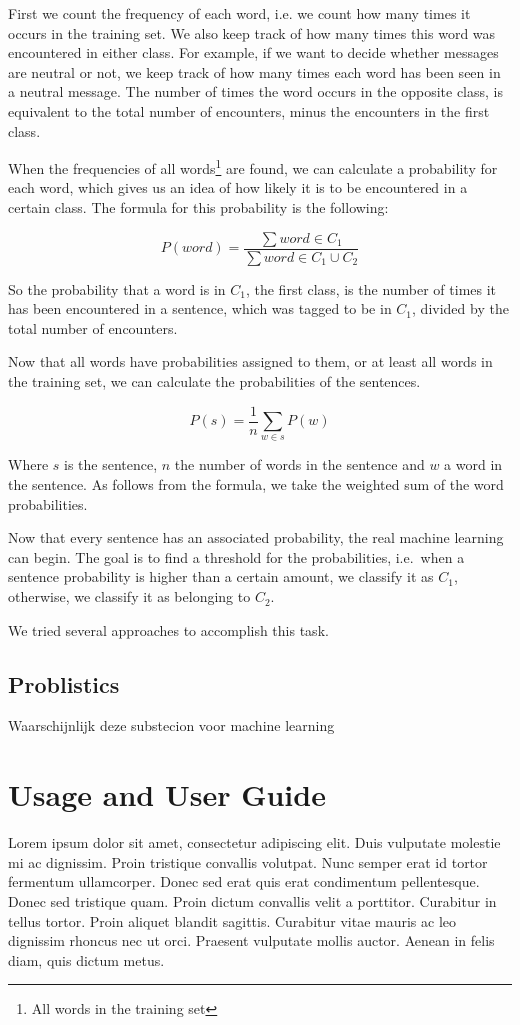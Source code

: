 \documentclass[11pt]{article}
\begin{document}
First we count the frequency of each word, i.e. we count how many times it occurs in the training set. We also keep track of how many times this word was encountered in either class. For example, if we want to decide whether messages are neutral or not, we keep track of how many times each word has been seen in a neutral message. The number of times the word occurs in the opposite class, is equivalent to the total number of encounters, minus the encounters in the first class.

When the frequencies of all words\footnote{All words in the training set} are found, we can calculate a probability for each word, which gives us an idea of how likely it is to be encountered in a certain class. The formula for this probability is the following:

\begin{equation}
P(word) = \frac{ \sum word \in C_1}{\sum word \in C_1\cup C_2}
\end{equation}

So the probability that a word is in $C_1$, the first class, is the number of times it has been encountered in a sentence, which was tagged to be in $C_1$, divided by the total number of encounters.

Now that all words have probabilities assigned to them, or at least all words in the training set, we can calculate the probabilities of the sentences.

\begin{equation}
P(s) = \frac{1}{n} \sum_{w \in s} P(w)
\end{equation}

Where $s$ is the sentence, $n$ the number of words in the sentence and $w$ a word in the sentence. As follows from the formula, we take the weighted sum of the word probabilities.

Now that every sentence has an associated probability, the real machine learning can begin. The goal is to find a threshold for the probabilities, i.e.\ when a sentence probability is higher than a certain amount, we classify it as $C_1$,  otherwise, we classify it as belonging to $C_2$.

We tried several approaches to accomplish this task.

\subsection{Problistics}
Waarschijnlijk deze substecion voor machine learning

\section{Usage and User Guide}
Lorem ipsum dolor sit amet, consectetur adipiscing elit. Duis vulputate molestie mi ac dignissim. Proin tristique convallis volutpat. Nunc semper erat id tortor fermentum ullamcorper. Donec sed erat quis erat condimentum pellentesque. Donec sed tristique quam. Proin dictum convallis velit a porttitor. Curabitur in tellus tortor. Proin aliquet blandit sagittis. Curabitur vitae mauris ac leo dignissim rhoncus nec ut orci. Praesent vulputate mollis auctor. Aenean in felis diam, quis dictum metus.
\end{document}
